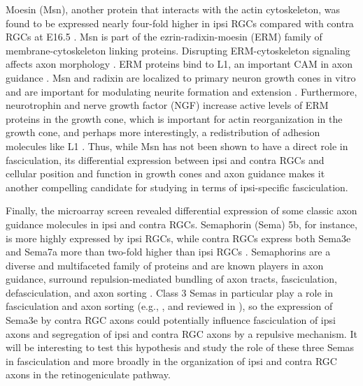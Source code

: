 Moesin (Msn), another protein that interacts with the actin cytoskeleton, was found to be expressed nearly four-fold higher in ipsi RGCs compared with contra RGCs at E16.5 \cite{wang2016ipsilateral}.
Msn is part of the ezrin-radixin-moesin (ERM) family of membrane-cytoskeleton linking proteins.
Disrupting ERM-cytoskeleton signaling affects axon morphology \cite{dickson2002functional,marsick2012activation}.
ERM proteins bind to L1, an important CAM in axon guidance \cite{dickson2002functional,marsick2012activation}. 
Msn and radixin are localized to primary neuron growth cones in vitro and are important for modulating neurite formation and extension \cite{paglini1998suppression}.
Furthermore, neurotrophin and nerve growth factor (NGF) increase active levels of ERM proteins in the growth cone, which is important for actin reorganization in the growth cone, and perhaps more interestingly, a redistribution of adhesion molecules like L1 \cite{marsick2012activation}.
Thus, while Msn has not been shown to have a direct role in fasciculation, its differential expression between ipsi and contra RGCs and cellular position and function in growth cones and axon guidance makes it another compelling candidate for studying in terms of ipsi-specific fasciculation.

Finally, the microarray screen revealed differential expression of some classic axon guidance molecules in ipsi and contra RGCs.
Semaphorin (Sema) 5b, for instance, is more highly expressed by ipsi RGCs, while contra RGCs express both Sema3e and Sema7a more than two-fold higher than ipsi RGCs \cite{wang2016ipsilateral}.
Semaphorins are a diverse and multifaceted family of proteins and are known players in axon guidance, surround repulsion-mediated bundling of axon tracts, fasciculation, defasciculation, and axon sorting \cite{raper2000semaphorins,tran2007semaphorin,imai2009pre,kolodkin2011mechanisms,kuwajima2012optic,zhou2013axon}.
Class 3 Semas in particular play a role in fasciculation and axon sorting (e.g., , and reviewed in ), so the expression of Sema3e by contra RGC axons could potentially influence fasciculation of ipsi axons and segregation of ipsi and contra RGC axons by a repulsive mechanism.
It will be interesting to test this hypothesis and study the role of these three Semas in fasciculation and more broadly in the organization of ipsi and contra RGC axons in the retinogeniculate pathway.

